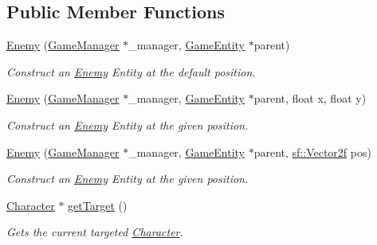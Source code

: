\subsection*{Public Member Functions}
\begin{DoxyCompactItemize}
\item 
\mbox{\hyperlink{class_enemy_afbeea953604d996ac52253ae7c73cd21}{Enemy}} (\mbox{\hyperlink{class_game_manager}{Game\+Manager}} $\ast$\+\_\+manager, \mbox{\hyperlink{class_game_entity}{Game\+Entity}} $\ast$parent)
\begin{DoxyCompactList}\small\item\em Construct an \mbox{\hyperlink{class_enemy}{Enemy}} Entity at the default position. \end{DoxyCompactList}\item 
\mbox{\hyperlink{class_enemy_a0357c3d13cf104705fd0cbdf47a71673}{Enemy}} (\mbox{\hyperlink{class_game_manager}{Game\+Manager}} $\ast$\+\_\+manager, \mbox{\hyperlink{class_game_entity}{Game\+Entity}} $\ast$parent, float x, float y)
\begin{DoxyCompactList}\small\item\em Construct an \mbox{\hyperlink{class_enemy}{Enemy}} Entity at the given position. \end{DoxyCompactList}\item 
\mbox{\hyperlink{class_enemy_aaa4ab19da21f8646613947e64c92d38a}{Enemy}} (\mbox{\hyperlink{class_game_manager}{Game\+Manager}} $\ast$\+\_\+manager, \mbox{\hyperlink{class_game_entity}{Game\+Entity}} $\ast$parent, \mbox{\hyperlink{classsf_1_1_vector2}{sf\+::\+Vector2f}} pos)
\begin{DoxyCompactList}\small\item\em Construct an \mbox{\hyperlink{class_enemy}{Enemy}} Entity at the given position. \end{DoxyCompactList}\item 
\mbox{\label{class_enemy_a12d1b976c4a411095a0fd0d3d99f9753}} 
\mbox{\hyperlink{class_character}{Character}} $\ast$ \mbox{\hyperlink{class_enemy_a12d1b976c4a411095a0fd0d3d99f9753}{get\+Target}} ()
\begin{DoxyCompactList}\small\item\em Gets the current targeted \mbox{\hyperlink{class_character}{Character}}. \end{DoxyCompactList}\item 
\mbox{\label{class_enemy_abc6aabdcf4d373bec18ca76fa3a6252b}} 

\end{DoxyCompactItemize}
